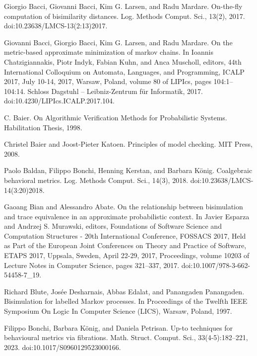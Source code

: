 \documentclass[10pt,a4paper]{article}
\begin{document}
\par\noindent  [5]  Giorgio Bacci, Giovanni Bacci, Kim G. Larsen, and Radu Mardare.  On-the-fly computation of bisimilarity distances.  Log. Methods Comput. Sci., 13(2), 2017.  doi:10.23638/LMCS-13(2:13)2017.  
 
\par\noindent  [6]  Giovanni Bacci, Giorgio Bacci, Kim G. Larsen, and Radu Mardare.  On the metric-based approximate minimization of markov chains.  In Ioannis Chatzigiannakis, Piotr Indyk, Fabian Kuhn, and Anca Muscholl, editors, 44th International Colloquium on Automata, Languages, and Programming, ICALP 2017, July 10-14, 2017, Warsaw, Poland, volume 80 of LIPIcs, pages 104:1–104:14. Schloss Dagstuhl – Leibniz-Zentrum für Informatik, 2017.  doi:10.4230/LIPIcs.ICALP.2017.104.  
 
\par\noindent  [7]  C. Baier.  On Algorithmic Verification Methods for Probabilistic Systems.  Habilitation Thesis, 1998.  
 
\par\noindent  [8]  Christel Baier and Joost-Pieter Katoen.  Principles of model checking.  MIT Press, 2008.  
 
\par\noindent  [9]  Paolo Baldan, Filippo Bonchi, Henning Kerstan, and Barbara König.  Coalgebraic behavioral metrics.  Log. Methods Comput. Sci., 14(3), 2018.  doi:10.23638/LMCS-14(3:20)2018.  
 
\par\noindent  [10]  Gaoang Bian and Alessandro Abate.  On the relationship between bisimulation and trace equivalence in an approximate probabilistic context.  In Javier Esparza and Andrzej S. Murawski, editors, Foundations of Software Science and Computation Structures - 20th International Conference, FOSSACS 2017, Held as Part of the European Joint Conferences on Theory and Practice of Software, ETAPS 2017, Uppsala, Sweden, April 22-29, 2017, Proceedings, volume 10203 of Lecture Notes in Computer Science, pages 321–337, 2017.  doi:10.1007/978-3-662-54458-7\_19.  
 
\par\noindent  [11]  Richard Blute, Josée Desharnais, Abbas Edalat, and Panangaden Panangaden.  Bisimulation for labelled Markov processes.  In Proceedings of the Twelfth IEEE Symposium On Logic In Computer Science (LICS), Warsaw, Poland, 1997.  
 
\par\noindent  [12]  Filippo Bonchi, Barbara König, and Daniela Petrisan.  Up-to techniques for behavioural metrics via fibrations.  Math. Struct. Comput. Sci., 33(4-5):182–221, 2023.  doi:10.1017/S0960129523000166.  
 
\end{document}
